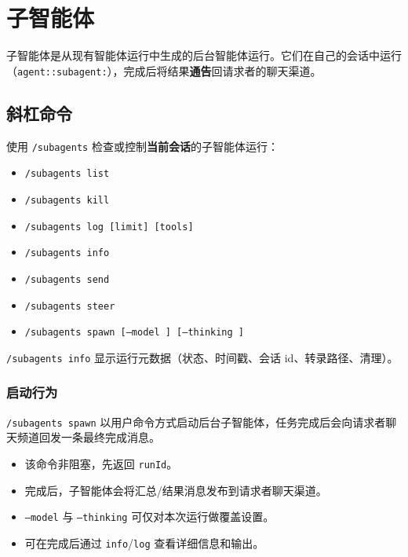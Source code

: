 \clearpage

\section{子智能体}


子智能体是从现有智能体运行中生成的后台智能体运行。它们在自己的会话中运行（\texttt{agent::subagent:}），完成后将结果\textbf{通告}回请求者的聊天渠道。

\subsection{斜杠命令}


使用 \texttt{/subagents} 检查或控制\textbf{当前会话}的子智能体运行：

\begin{itemize}
  \item \texttt{/subagents list}
  \item \texttt{/subagents kill }
  \item \texttt{/subagents log  [limit] [tools]}
  \item \texttt{/subagents info }
  \item \texttt{/subagents send  }
  \item \texttt{/subagents steer  }
  \item \texttt{/subagents spawn   [--model ] [--thinking ]}
\end{itemize}


\texttt{/subagents info} 显示运行元数据（状态、时间戳、会话 id、转录路径、清理）。

\subsubsection{启动行为}


\texttt{/subagents spawn} 以用户命令方式启动后台子智能体，任务完成后会向请求者聊天频道回发一条最终完成消息。

\begin{itemize}
  \item 该命令非阻塞，先返回 \texttt{runId}。
  \item 完成后，子智能体会将汇总/结果消息发布到请求者聊天渠道。
  \item \texttt{--model} 与 \texttt{--thinking} 可仅对本次运行做覆盖设置。
  \item 可在完成后通过 \texttt{info}/\texttt{log} 查看详细信息和输出。
\end{itemize}


